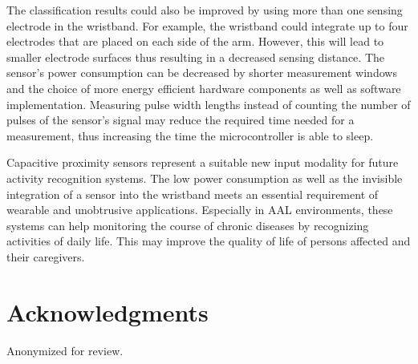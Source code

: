 \documentclass[runningheads,a4paper]{llncs}
\begin{document}
The classification results could also be improved by using more than one sensing electrode in the wristband. For example, the wristband could integrate up to four electrodes that are placed on each side of the arm. However, this will lead to smaller electrode surfaces thus resulting in a decreased sensing distance. The sensor's power consumption can be decreased by shorter measurement windows and the choice of more energy efficient hardware components as well as software implementation. Measuring pulse width lengths instead of counting the number of pulses of the sensor's signal may reduce the required time needed for a measurement, thus increasing the time the microcontroller is able to sleep.

Capacitive proximity sensors represent a suitable new input modality for future activity recognition systems. The low power consumption as well as the invisible integration of a sensor into the wristband meets an essential requirement of wearable and unobtrusive applications. Especially in AAL environments, these systems can help monitoring the course of chronic diseases by recognizing activities of daily life. This may improve the quality of life of persons affected and their caregivers. 

\section*{Acknowledgments}

Anonymized for review.





\end{document}
